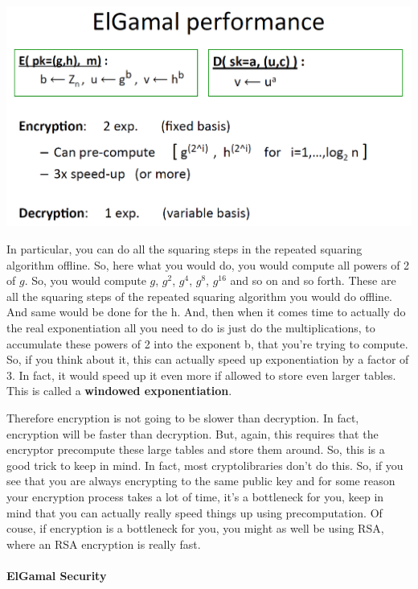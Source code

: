 \documentclass[11pt]{article}
\makeatletter
\def\maxwidth{\ifdim\Gin@nat@width>\linewidth\linewidth
    \else\Gin@nat@width\fi}
\let\Oldincludegraphics\includegraphics
\renewcommand{\includegraphics}[1]{\Oldincludegraphics[width=.8\maxwidth]{#1}}
\makeatother
\begin{document}
\includegraphics{./Images/ElGamalPerformance.png}

In particular, you can do all the squaring steps in the repeated
squaring algorithm offline. So, here what you would do, you would
compute all powers of 2 of \(g\). So, you would compute \(g\), \(g^2\),
\(g^4\), \(g^8\), \(g^{16}\) and so on and so forth. These are all the
squaring steps of the repeated squaring algorithm you would do offline.
And same would be done for the h. And, then when it comes time to
actually do the real exponentiation all you need to do is just do the
multiplications, to accumulate these powers of 2 into the exponent b,
that you're trying to compute. So, if you think about it, this can
actually speed up exponentiation by a factor of 3. In fact, it would
speed up it even more if allowed to store even larger tables. This is
called a \textbf{windowed exponentiation}.

Therefore encryption is not going to be slower than decryption. In fact,
encryption will be faster than decryption. But, again, this requires
that the encryptor precompute these large tables and store them around.
So, this is a good trick to keep in mind. In fact, most cryptolibraries
don't do this. So, if you see that you are always encrypting to the same
public key and for some reason your encryption process takes a lot of
time, it's a bottleneck for you, keep in mind that you can actually
really speed things up using precomputation. Of couse, if encryption is
a bottleneck for you, you might as well be using RSA, where an RSA
encryption is really fast.

\hypertarget{elgamal-security}{%
\paragraph{ElGamal Security}\label{elgamal-security}}
\end{document}
